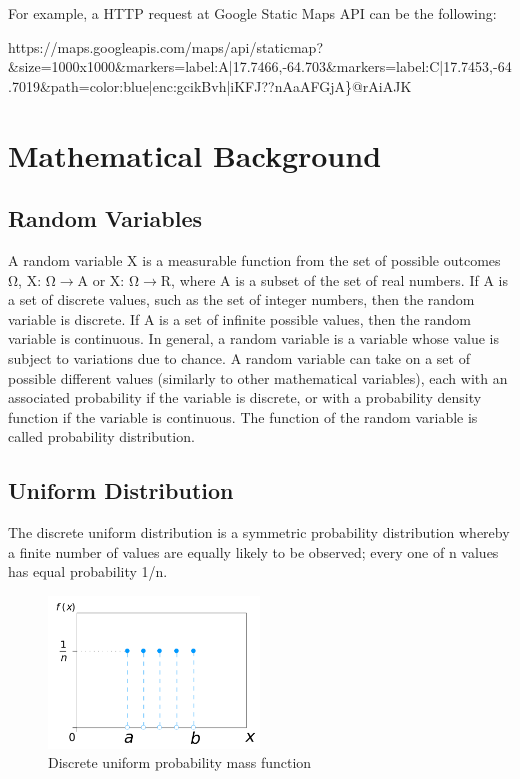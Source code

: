 For example, a HTTP request at Google Static Maps API can be the following:

\begin{center}
 https://maps.googleapis.com/maps/api/staticmap?\&size=1000x1000\&markers=label:A|17.7466,-64.703\&markers=label:C|17.7453,-64.7019\&path=color:blue|enc:gcikBvh|iKFJ??nAaAFGjA\}@rAiAJK
\end{center}

\section{Mathematical Background}

\subsection{Random Variables}

A random variable X is a measurable function from the set of possible outcomes Ω, Χ: Ω\(\rightarrow\)A or Χ: Ω\(\rightarrow\)R, where A is a 
subset of the set of real numbers. If A is a set of discrete values, such as the set of integer numbers, then the random variable is discrete. 
If A is a set of infinite possible values, then the random variable is continuous. In general, a random variable is a variable whose value is 
subject to variations due to chance. A random variable can take on a set of possible different values (similarly to other mathematical variables), 
each with an associated probability if the variable is discrete, or with a probability density function if the variable is continuous. 
The function of the random variable is called probability distribution.

\subsection{Uniform Distribution}

The discrete uniform distribution is a symmetric probability distribution whereby a finite number of values are equally likely to be observed; 
every one of n values has equal probability 1/n. 

\begin{figure}[H]
  \centering
  \includegraphics[width=0.5\textwidth]{figures/uniform_1.png}
  \caption{Discrete uniform probability mass function}
\end{figure}

